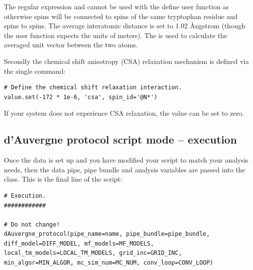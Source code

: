\begin{htmlonly}
\begin{htmlonly}
The regular expression  and  cannot be used with the  define user function as otherwise  spins will be connected to  spins of the same tryptophan residue and  spins to  spins.  The average interatomic distance is set to 1.02 \AA ngstrom (though the  user function expects the units of meters).  The  is used to calculate the averaged unit vector between the two atoms.

Secondly the chemical shift anisotropy (CSA) relaxation mechanism is defined via the single command:

\begin{lstlisting}[firstnumber=198]
# Define the chemical shift relaxation interaction.
value.set(-172 * 1e-6, 'csa', spin_id='@N*')
\end{lstlisting}

If your system does not experience CSA relaxation, the value can be set to zero.


\subsection{d'Auvergne protocol script mode -- execution}

Once the data is set up and you have modified your script to match your analysis needs, then the data pipe, pipe bundle and analysis variables are passed into the  class.  This is the final line of the script:

\begin{lstlisting}[firstnumber=203]
# Execution.
############

# Do not change!
dAuvergne_protocol(pipe_name=name, pipe_bundle=pipe_bundle, diff_model=DIFF_MODEL, mf_models=MF_MODELS, local_tm_models=LOCAL_TM_MODELS, grid_inc=GRID_INC, min_algor=MIN_ALGOR, mc_sim_num=MC_NUM, conv_loop=CONV_LOOP)
\end{lstlisting}


\end{htmlonly}
\end{htmlonly}

